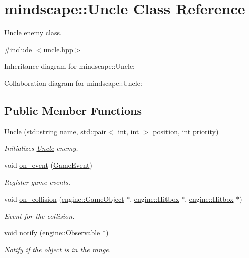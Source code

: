 \hypertarget{classmindscape_1_1_uncle}{}\section{mindscape\+:\+:Uncle Class Reference}
\label{classmindscape_1_1_uncle}


\hyperlink{classmindscape_1_1_uncle}{Uncle} enemy class.  




{\ttfamily \#include $<$uncle.\+hpp$>$}



Inheritance diagram for mindscape\+:\+:Uncle\+:


Collaboration diagram for mindscape\+:\+:Uncle\+:
\subsection*{Public Member Functions}
\begin{DoxyCompactItemize}
\item 
\hyperlink{classmindscape_1_1_uncle_a82e6c0ce316c1c3f7a9620b639907239}{Uncle} (std\+::string \hyperlink{classengine_1_1_game_object_a1f104f7af4f351e6d3278319762c9fe5}{name}, std\+::pair$<$ int, int $>$ position, int \hyperlink{classengine_1_1_game_object_a159ecaca30229e302793b11a75bd13c2}{priority})
\begin{DoxyCompactList}\small\item\em Initializes \hyperlink{classmindscape_1_1_uncle}{Uncle} enemy. \end{DoxyCompactList}\item 
void \hyperlink{classmindscape_1_1_uncle_aa85eb4ff4b7b6ed6e1e275259542a43c}{on\+\_\+event} (\hyperlink{class_game_event}{Game\+Event})
\begin{DoxyCompactList}\small\item\em Register game events. \end{DoxyCompactList}\item 
void \hyperlink{classmindscape_1_1_uncle_a363b3577c79c88a0e0d13a907723778c}{on\+\_\+collision} (\hyperlink{classengine_1_1_game_object}{engine\+::\+Game\+Object} $\ast$, \hyperlink{classengine_1_1_hitbox}{engine\+::\+Hitbox} $\ast$, \hyperlink{classengine_1_1_hitbox}{engine\+::\+Hitbox} $\ast$)
\begin{DoxyCompactList}\small\item\em Event for the collision. \end{DoxyCompactList}\item 
void \hyperlink{classmindscape_1_1_uncle_a9bf90a2b110d3d4b6c9b792bc9988999}{notify} (\hyperlink{classengine_1_1_observable}{engine\+::\+Observable} $\ast$)
\begin{DoxyCompactList}\small\item\em Notify if the object is in the range. \end{DoxyCompactList}\end{DoxyCompactItemize}

